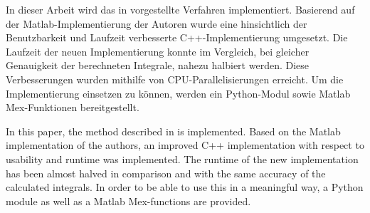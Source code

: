 \kurzfassung



In dieser Arbeit wird das in  \cite{gasperini:hal-03209144} vorgestellte Verfahren implementiert. Basierend auf der Matlab-Implementierung der Autoren wurde eine hinsichtlich der Benutzbarkeit und Laufzeit verbesserte C++-Implementierung umgesetzt.
Die Laufzeit der neuen Implementierung konnte im Vergleich, bei gleicher Genauigkeit der berechneten Integrale, nahezu halbiert werden.  
Diese Verbesserungen wurden mithilfe von CPU-Parallelisierungen erreicht. 
Um die Implementierung einsetzen zu können, werden ein Python-Modul sowie Matlab Mex-Funktionen bereitgestellt.


\kurzfassungEN

In this paper, the method described in  \cite{gasperini:hal-03209144}
is implemented. Based on the Matlab implementation of the
authors, an improved C++ implementation with respect to usability and runtime was implemented. The runtime of the new implementation has been
almost halved in comparison and with the same accuracy of the calculated
integrals. In order to be able to use this in a meaningful way, a Python module as well as a
Matlab Mex-functions are provided.